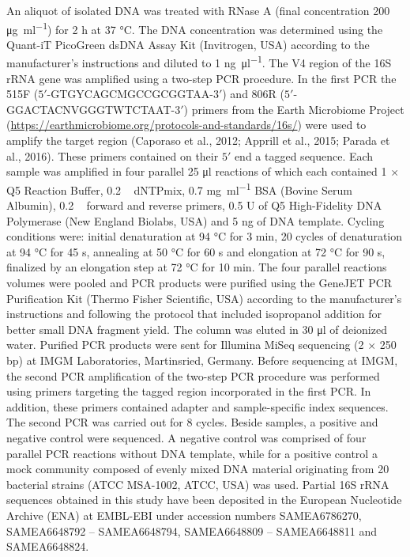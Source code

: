 \documentclass[12pt,]{article}
\begin{document}
An aliquot of isolated DNA was treated with RNase A (final concentration
200 \si{\ug\per\ml}) for 2 \si{\hour} at 37 \si{\degreeCelsius}. The DNA
concentration was determined using the Quant-iT PicoGreen dsDNA Assay
Kit (Invitrogen, USA) according to the manufacturer's instructions and
diluted to 1 \si{\ng\per\ul}. The V4 region of the 16S rRNA gene was
amplified using a two-step PCR procedure. In the first PCR the 515F
(\(5'\)-GTGYCAGCMGCCGCGGTAA-\(3'\)) and 806R
(\(5'\)-GGACTACNVGGGTWTCTAAT-\(3'\)) primers from the Earth Microbiome
Project (\url{https://earthmicrobiome.org/protocols-and-standards/16s/})
were used to amplify the target region (Caporaso et al., 2012; Apprill
et al., 2015; Parada et al., 2016). These primers contained on their
\(5'\) end a tagged sequence. Each sample was amplified in four parallel
25 \si{\ul} reactions of which each contained 1 × Q5 Reaction Buffer,
0.2 \si{\milli\Molar} dNTPmix, 0.7 \si{\mg\per\ml} BSA (Bovine Serum
Albumin), 0.2 \si{\micro\Molar} forward and reverse primers, 0.5 U of Q5
High-Fidelity DNA Polymerase (New England Biolabs, USA) and 5 \si{\ng}
of DNA template. Cycling conditions were: initial denaturation at 94
\si{\degreeCelsius} for 3 \si{\minute}, 20 cycles of denaturation at 94
\si{\degreeCelsius} for 45 \si{\s}, annealing at 50 \si{\degreeCelsius}
for 60 \si{\s} and elongation at 72 \si{\degreeCelsius} for 90 \si{\s},
finalized by an elongation step at 72 \si{\degreeCelsius} for 10
\si{\minute}. The four parallel reactions volumes were pooled and PCR
products were purified using the GeneJET PCR Purification Kit (Thermo
Fisher Scientific, USA) according to the manufacturer's instructions and
following the protocol that included isopropanol addition for better
small DNA fragment yield. The column was eluted in 30 \si{\ul} of
deionized water. Purified PCR products were sent for Illumina MiSeq
sequencing (2 × 250 bp) at IMGM Laboratories, Martinsried, Germany.
Before sequencing at IMGM, the second PCR amplification of the two-step
PCR procedure was performed using primers targeting the tagged region
incorporated in the first PCR. In addition, these primers contained
adapter and sample-specific index sequences. The second PCR was carried
out for 8 cycles. Beside samples, a positive and negative control were
sequenced. A negative control was comprised of four parallel PCR
reactions without DNA template, while for a positive control a mock
community composed of evenly mixed DNA material originating from 20
bacterial strains (ATCC MSA-1002, ATCC, USA) was used. Partial 16S rRNA
sequences obtained in this study have been deposited in the European
Nucleotide Archive (ENA) at EMBL-EBI under accession numbers
SAMEA6786270, SAMEA6648792 -- SAMEA6648794, SAMEA6648809 -- SAMEA6648811
and SAMEA6648824.
\end{document}
